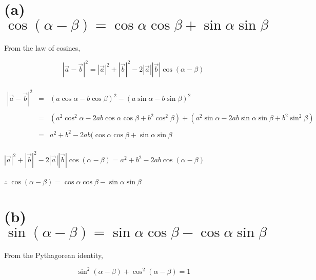 \documentclass[a4paper]{article}
\begin{document}
\Large
\section*{(a)  $\cos(\alpha - \beta) = \cos\alpha\cos\beta + \sin\alpha\sin\beta$}

From the law of cosines,

\begin{equation}
  |\vec{a} - \vec{b}|^2 = |\vec{a}|^2 + |\vec{b}|^2 - 2|\vec{a}||\vec{b}|\cos(\alpha - \beta) 
\end{equation}
\\

$\begin{array}{rcl}
	| \vec{a} - \vec{b} |^2  & = & (a \cos \alpha - b \cos \beta)^2 - (a \sin \alpha - b \sin \beta)^2 \\
\\
	& = & ( a^2\cos^2\alpha - 2ab \cos\alpha\cos\beta + b^2\cos^2\beta) + (a^2\sin\alpha - 2ab\sin\alpha\sin\beta + b^2\sin^2\beta) \\
\\
	& = & a^2 + b^2 - 2ab(\cos\alpha\cos\beta+\sin\alpha\sin\beta
\end{array}
$\\\\

$
|\vec{a}|^2+|\vec{b}|^2-2|\vec{a}||\vec{b}|\cos(\alpha-\beta) = a^2 + b^2 - 2ab\cos(\alpha-\beta) 
$
\\\\

$
\therefore \ \cos (\alpha - \beta) = \cos\alpha \cos \beta - \sin \alpha \sin \beta
$

\section*{(b)  $ \sin (\alpha - \beta) = \sin\alpha \cos \beta - \cos \alpha \sin \beta $}

From the Pythagorean identity, 

\begin{equation}
  \sin^2(\alpha-\beta)+\cos^2(\alpha-\beta) = 1
\end{equation}
\\
\end{document}
